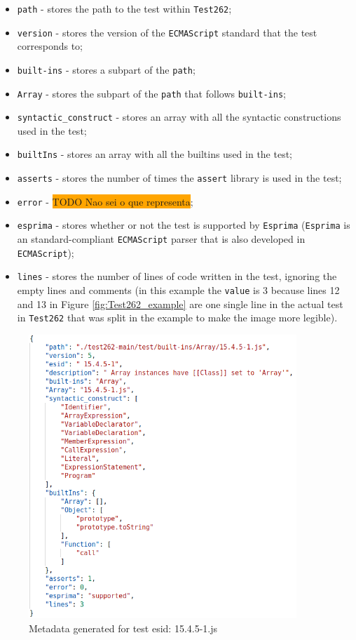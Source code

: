 \documentclass[runningheads]{llncs}
\begin{document}
\begin{itemize}
    \item \texttt{path} - stores the path to the test within \texttt{Test262};
    \item \texttt{version} - stores the version of the \texttt{ECMAScript} standard that the test corresponds to;
    \item \texttt{built-ins} - stores a subpart of the \texttt{path};
    \item \texttt{Array} - stores the subpart of the \texttt{path} that follows \texttt{built-ins};
    \item \texttt{syntactic\_construct} - stores an array with all the syntactic constructions used in the test;
    \item \texttt{builtIns} - stores an array with all the builtins used in the test;
    \item \texttt{asserts} - stores the number of times the \texttt{assert} library is used in the test;
    \item \texttt{error} - \colorbox{orange}{TODO Nao sei o que representa};
    \item \texttt{esprima} - stores whether or not the test is supported by \texttt{Esprima}\cite{Esprima} (\texttt{Esprima} is an standard-compliant \texttt{ECMAScript} parser that is also developed in \texttt{ECMAScript});
    \item \texttt{lines} - stores the number of lines of code written in the test, ignoring the empty lines and comments (in this example the \texttt{value} is 3 because lines 12 and 13 in Figure \ref{fig:Test262_example} are one single line in the actual test in \texttt{Test262} that was split in the example to make the image more legible).
\end{itemize}

\begin{figure}[ht]
    \centering
    \includegraphics[width=0.9\textwidth]{images/json_metadata.png}
    \caption{Metadata generated for test esid: 15.4.5-1.js}
    \label{fig:json_metadata}
\end{figure}
\end{document}
